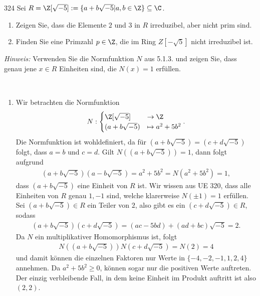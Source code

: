 \begin{algebraUE}{324}
Sei $R = \Z[\sqrt{-5}] := \{a + b\sqrt{-5} | a,b \in \Z\} \subseteq \C$.
\begin{enumerate}
  \item Zeigen Sie, dass die Elemente $2$ und $3$ in $R$ irreduzibel, aber nicht prim
  sind.
  \item Finden Sie eine Primzahl $p \in \Z$, die im Ring $Z[-\sqrt{5}]$ nicht irreduzibel ist.
\end{enumerate}
\textit{Hinweis:} Verwenden Sie die Normfunktion $N$ aus 5.1.3. und zeigen Sie,
dass genau jene $x \in R$ Einheiten sind, die $N(x) = 1$ erfüllen.
\end{algebraUE}
\begin{solution}
\leavevmode \\
\begin{enumerate}
  \item Wir betrachten die Normfunktion
  \begin{align*}
    N: \begin{cases}
      \Z[\sqrt{-5}] &\to \Z \\
      (a + b\sqrt{-5}) &\mapsto a^2 + 5b^2
    \end{cases}.
  \end{align*}
  Die Normfunktion ist wohldefiniert, da für $(a + b\sqrt{-5}) = (c + d\sqrt{-5})$
  folgt, dass $a = b$ und $c = d$.
  Gilt $N((a + b\sqrt{-5}) ) = 1$, dann folgt aufgrund
  \begin{align*}
    (a + b\sqrt{-5})(a - b\sqrt{-5}) = a^2 + 5b^2 = N(a^2 + 5b^2) = 1,
  \end{align*}
  dass $(a + b\sqrt{-5})$ eine Einheit von $R$ ist.
  Wir wissen aus UE 320, dass alle Einheiten von $R$ genau $1,-1$ sind,
  welche klarerweise $N(\pm 1) = 1$ erfüllen.
  Sei $(a + b\sqrt{-5}) \in R$ ein Teiler von $2$, also gibt es ein $(c + d\sqrt{-5}) \in R$, sodass
  \begin{align*}
    (a + b\sqrt{-5})(c + d\sqrt{-5}) = (ac - 5bd) + (ad + bc)\sqrt{-5} = 2.
  \end{align*}
  Da $N$ ein multiplikativer Homomorphismus ist, folgt
  \begin{align*}
    N((a + b\sqrt{-5}))N(c + d\sqrt{-5}) = N(2) = 4
  \end{align*}
  und damit können die einzelnen Faktoren nur Werte in $\{-4,-2,-1,1,2,4\}$ annehmen.
  Da $a^2 + 5b^2 \geq 0$, können sogar nur die positiven Werte auftreten.
  Der einzig verbleibende Fall, in dem keine Einheit im Produkt auftritt ist also $(2,2)$.

\end{enumerate}
\end{solution}
